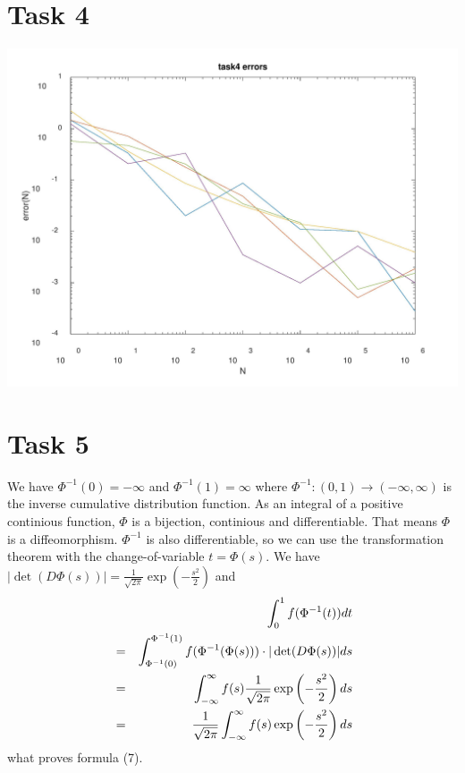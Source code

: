 \documentclass[10pt,a4paper]{article}
\begin{document}
\section*{Task 4}

\begin{center}
\includegraphics[scale=0.3]{task4.jpg}		
\end{center}	

\section*{Task 5}
We have $\Phi^{-1}(0)=-\infty$ and $\Phi^{-1}(1)=\infty$ where $\Phi^{-1}:(0,1)\to(-\infty,\infty)$ is the inverse cumulative distribution function. As an integral of a positive continious function, $\Phi$ is a bijection, continious and differentiable. That means $\Phi$ is a diffeomorphism. $\Phi^{-1}$ is also differentiable, so we can use the transformation theorem with the change-of-variable $t=\Phi(s)$. We have $|\det(D\Phi(s))|=\frac{1}{\sqrt{2\pi}}\exp(-\frac{s^2}{2})$ and
\begin{eqnarray}
&&\int_0^1 f(\Phi^{-1}(t))dt \notag\\
&=&\int_{\Phi^{-1}(0)}^{\Phi^{-1}(1)}f(\Phi^{-1}(\Phi(s)))\cdot|\det(D\Phi(s))|ds \notag\\
&=&\int_{-\infty}^{\infty}f(s)\frac{1}{\sqrt{2\pi}}\exp\left(-\frac{s^2}{2}\right)ds \notag\\
&=&\frac{1}{\sqrt{2\pi}}\int_{-\infty}^{\infty}f(s)\exp\left(-\frac{s^2}{2}\right)ds \notag
\end{eqnarray}
what proves formula (7).
\end{document}

